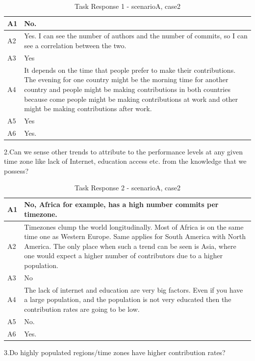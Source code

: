 \documentclass[seploa]{beavtex}
\begin{document}
\begin{table}[H]
\begin{tabular}{ |p{2cm}|p{12cm}| }
 \hline
 A1 & No.\\
 \hline
 A2 & Yes. I can see the number of authors and the number of commits, so I can see a correlation between the two.\\ \hline
 A3 & Yes\\ \hline
 A4 & It depends on the time that people prefer to make their contributions. The evening for one country might be the morning time for another country and people might be making contributions in both countries because come people might be making contributions at work and other might be making contributions after work.\\ \hline
 A5 & Yes\\ \hline
 A6 & Yes.\\
 \hline
\end{tabular}
\caption{Task Response 1 - scenarioA, case2}
\label{tab:table11}
\end{table}


2.Can we sense other trends to attribute to the performance levels at any given time zone like lack of Internet, education access etc. from the knowledge that we possess?

\begin{table}[H]
\begin{tabular}{ |p{2cm}|p{12cm}| }
 \hline
 A1 & No, Africa for example, has a high number commits per timezone.\\
 \hline
 A2 & Timezones clump the world longitudinally. Most of Africa is on the same time one as Western Europe. Same applies for South America with North America. The only place when such a trend can be seen is Asia, where one would expect a higher number of contributors due to a higher population.\\ \hline
 A3 & No\\ \hline
 A4 & The lack of internet and education are very big factors. Even if you have a large population, and the population is not very educated then the contribution rates are going to be low.\\ \hline
 A5 & No.\\ \hline
 A6 & Yes.\\
 \hline
\end{tabular}
\caption{Task Response 2 - scenarioA, case2}
\label{tab:table12}
\end{table}


3.Do highly populated regions/time zones have higher contribution rates?
\end{document}
